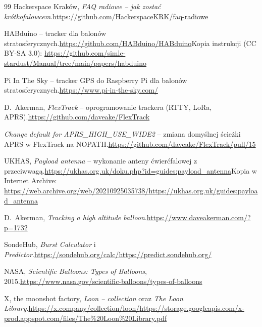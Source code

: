 \begin{thebibliography}{99}
 Hackerspace Kraków, \emph{FAQ radiowe -- jak zostać krótkofalowcem}.\newline\url{https://github.com/HackerspaceKRK/faq-radiowe}

 HABduino -- tracker dla balonów stratosferycznych.\newline\url{https://github.com/HABduino/HABduino}\newline Kopia instrukcji (CC BY-SA 3.0): \url{https://github.com/simle-stardust/Manual/tree/main/papers/habduino}

 Pi In The Sky -- tracker GPS do Raspberry Pi dla balonów stratosferycznych.\newline\url{https://www.pi-in-the-sky.com/}

 D.~Akerman, \emph{FlexTrack} -- oprogramowanie trackera (RTTY, LoRa, APRS).\newline\url{https://github.com/daveake/FlexTrack}

 \emph{Change default for APRS\_HIGH\_USE\_WIDE2} -- zmiana domyślnej ścieżki APRS w FlexTrack na NOPATH.\newline\url{https://github.com/daveake/FlexTrack/pull/15}

 UKHAS, \emph{Payload antenna} -- wykonanie anteny ćwierćfalowej z przeciwwagą.\newline\url{https://ukhas.org.uk/doku.php?id=guides:payload_antenna}\newline Kopia w Internet Archive: \url{https://web.archive.org/web/20210925035738/https://ukhas.org.uk/guides:payload_antenna}

 D.~Akerman, \emph{Tracking a high altitude balloon}.\newline\url{https://www.daveakerman.com/?p=1732}

 SondeHub, \emph{Burst Calculator} i \emph{Predictor}.\newline\url{https://sondehub.org/calc/}\newline\url{https://predict.sondehub.org/}

 NASA, \emph{Scientific Balloons: Types of Balloons}, 2015.\newline\url{https://www.nasa.gov/scientific-balloons/types-of-balloons}

 X, the moonshot factory, \emph{Loon -- collection} oraz \emph{The Loon Library}.\newline\url{https://x.company/collection/loon/}\newline\url{https://storage.googleapis.com/x-prod.appspot.com/files/The%20Loon%20Library.pdf}


\end{thebibliography}

